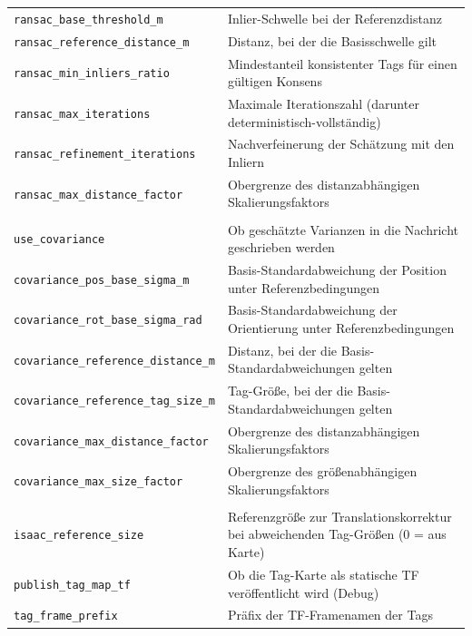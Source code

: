 {\begin{longtable}{@{}l p{}@{}}
\texttt{ransac\_base\_threshold\_m}      & Inlier-Schwelle bei der Referenzdistanz \\
\texttt{ransac\_reference\_distance\_m}  & Distanz, bei der die Basisschwelle gilt \\
\texttt{ransac\_min\_inliers\_ratio}     & Mindestanteil konsistenter Tags für einen gültigen Konsens \\
\texttt{ransac\_max\_iterations}         & Maximale Iterationszahl (darunter deterministisch-vollständig) \\
\texttt{ransac\_refinement\_iterations}  & Nachverfeinerung der Schätzung mit den Inliern \\
\texttt{ransac\_max\_distance\_factor}   & Obergrenze des distanzabhängigen Skalierungsfaktors \\
\addlinespace
\multicolumn{2}{@{}l}{\textit{Kovarianzschätzung}} \\
\texttt{use\_covariance}                 & Ob geschätzte Varianzen in die Nachricht geschrieben werden \\
\texttt{covariance\_pos\_base\_sigma\_m} & Basis-Standardabweichung der Position unter Referenzbedingungen \\
\texttt{covariance\_rot\_base\_sigma\_rad} & Basis-Standardabweichung der Orientierung unter Referenzbedingungen \\
\texttt{covariance\_reference\_distance\_m} & Distanz, bei der die Basis-Standardabweichungen gelten \\
\texttt{covariance\_reference\_tag\_size\_m} & Tag-Größe, bei der die Basis-Standardabweichungen gelten \\
\texttt{covariance\_max\_distance\_factor} & Obergrenze des distanzabhängigen Skalierungsfaktors \\
\texttt{covariance\_max\_size\_factor}   & Obergrenze des größenabhängigen Skalierungsfaktors \\
\addlinespace
\multicolumn{2}{@{}l}{\textit{Multi-Size und Debug}} \\
\texttt{isaac\_reference\_size}          & Referenzgröße zur Translationskorrektur bei abweichenden Tag-Größen (0 = aus Karte) \\
\texttt{publish\_tag\_map\_tf}           & Ob die Tag-Karte als statische TF veröffentlicht wird (Debug) \\
\texttt{tag\_frame\_prefix}              & Präfix der TF-Framenamen der Tags \\
\end{longtable}
}





